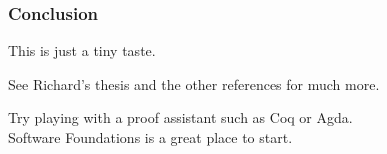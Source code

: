 \documentclass{beamer}
\begin{document}
\begin{frame}\frametitle{Conclusion}
This is just a tiny taste.
\bigskip  

See Richard's thesis and the other references for much more.  
\bigskip  

Try playing with a proof assistant such as Coq or Agda.\\
Software Foundations is a great place to start.
\end{frame}
\end{document}
